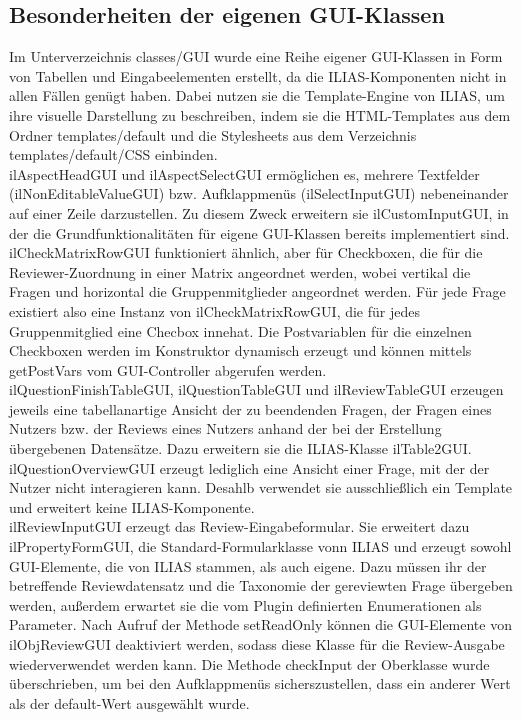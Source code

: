 \documentclass[a4paper]{scrreprt}
\begin{document}
\subsection{Besonderheiten der eigenen GUI-Klassen}
Im Unterverzeichnis classes/GUI wurde eine Reihe eigener GUI-Klassen in Form von Tabellen und Eingabeelementen erstellt, da die ILIAS-Komponenten nicht in allen Fällen genügt haben. Dabei nutzen sie die Template-Engine von ILIAS, um ihre visuelle Darstellung zu beschreiben, indem sie die HTML-Templates aus dem Ordner templates/default und die Stylesheets aus dem Verzeichnis templates/default/CSS einbinden.\\
ilAspectHeadGUI und ilAspectSelectGUI ermöglichen es, mehrere Textfelder (ilNonEditableValueGUI) bzw. Aufklappmenüs (ilSelectInputGUI) nebeneinander auf einer Zeile darzustellen. Zu diesem Zweck erweitern sie ilCustomInputGUI, in der die Grundfunktionalitäten für eigene GUI-Klassen bereits implementiert sind.\\
ilCheckMatrixRowGUI funktioniert ähnlich, aber für Checkboxen, die für die Reviewer-Zuordnung in einer Matrix angeordnet werden, wobei vertikal die Fragen und horizontal die Gruppenmitglieder angeordnet werden. Für jede Frage existiert also eine Instanz von ilCheckMatrixRowGUI, die für jedes Gruppenmitglied eine Checbox innehat. Die Postvariablen für die einzelnen Checkboxen werden im Konstruktor dynamisch erzeugt und können mittels getPostVars vom GUI-Controller abgerufen werden.\\
ilQuestionFinishTableGUI, ilQuestionTableGUI und ilReviewTableGUI erzeugen jeweils eine tabellanartige Ansicht der zu beendenden Fragen, der Fragen eines Nutzers bzw. der Reviews eines Nutzers anhand der bei der Erstellung übergebenen Datensätze. Dazu erweitern sie die ILIAS-Klasse ilTable2GUI.\\
ilQuestionOverviewGUI erzeugt lediglich eine Ansicht einer Frage, mit der der Nutzer nicht interagieren kann. Desahlb verwendet sie ausschließlich ein Template und erweitert keine ILIAS-Komponente.\\
ilReviewInputGUI erzeugt das Review-Eingabeformular. Sie erweitert dazu ilPropertyFormGUI, die Standard-Formularklasse vonn ILIAS und erzeugt sowohl GUI-Elemente, die von ILIAS stammen, als auch eigene. Dazu müssen ihr der betreffende Reviewdatensatz und die Taxonomie der gereviewten Frage übergeben werden, außerdem erwartet sie die vom Plugin definierten Enumerationen als Parameter. Nach Aufruf der Methode setReadOnly können die GUI-Elemente von ilObjReviewGUI deaktiviert werden, sodass diese Klasse für die Review-Ausgabe wiederverwendet werden kann. Die Methode checkInput der Oberklasse wurde überschrieben, um bei den Aufklappmenüs sicherszustellen, dass ein anderer Wert als der default-Wert ausgewählt wurde.\\
\end{document}
